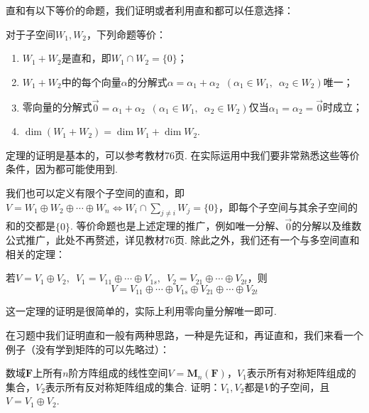 直和有以下等价的命题，我们证明或者利用直和都可以任意选择：
\begin{theorem}\label{thm:4:直和等价命题}
    对于子空间$W_1,W_2$，下列命题等价：
    \begin{enumerate}
        \item $W_1+W_2$是直和，即$W_1 \cap W_2=\{0\}$；

        \item $W_1+W_2$中的每个向量$\alpha$的分解式$\alpha=\alpha_1+\alpha_2\enspace(\alpha_1\in W_1,\enspace\alpha_2\in W_2)$唯一；

        \item 零向量的分解式$\vec{0}=\alpha_1+\alpha_2 \enspace(\alpha_1\in W_1,\enspace\alpha_2\in W_2)$仅当$\alpha_1=\alpha_2=\vec{0}$时成立；

        \item $\dim (W_1+W_2)=\dim W_1+\dim W_2$.
    \end{enumerate}
\end{theorem}

定理的证明是基本的，可以参考教材76页. 在实际运用中我们要非常熟悉这些等价条件，因为都可能使用到.

我们也可以定义有限个子空间的直和，即$V=W_1\oplus W_2\oplus\cdots\oplus W_n \iff W_i \cap \sum\limits_{j \neq i}W_j=\{0\}$，即每个子空间与其余子空间的和的交都是$\{0\}$. 等价命题也是上述定理的推广，例如唯一分解、$\vec{0}$的分解以及维数公式推广，此处不再赘述，详见教材76页. 除此之外，我们还有一个与多空间直和相关的定理：
\begin{theorem}\label{thm:4:多空间直和}
    若$V=V_1\oplus V_2,\enspace V_1=V_{11}\oplus\cdots\oplus V_{1s},\enspace V_2=V_{21}\oplus\cdots\oplus V_{2t}$，则
    \[V=V_{11}\oplus\cdots\oplus V_{1s}\oplus V_{21}\oplus\cdots\oplus V_{2t}\]
\end{theorem}
这一定理的证明是很简单的，实际上利用零向量分解唯一即可.

在习题中我们证明直和一般有两种思路，一种是先证和，再证直和，我们来看一个例子（没有学到矩阵的可以先略过）：
\begin{example}
    数域$\mathbf{F}$上所有$n$阶方阵组成的线性空间$V=\mathbf{M}_n(\mathbf{F})$，$V_1$表示所有对称矩阵组成的集合，$V_2$表示所有反对称矩阵组成的集合. 证明：$V_1,V_2$都是$V$的子空间，且$V=V_1\oplus V_2$.
\end{example}

